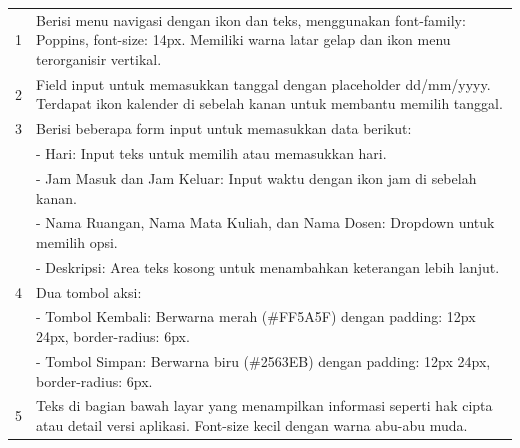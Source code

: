\begin{enumerate}
{\begin{longtable}{c p{}}
		      1                       & Berisi menu navigasi dengan ikon dan teks, menggunakan font-family: Poppins, font-size: 14px. Memiliki warna latar gelap dan ikon menu terorganisir vertikal. \\
		      2                       & Field input untuk memasukkan tanggal dengan placeholder dd/mm/yyyy. Terdapat ikon kalender di sebelah kanan untuk membantu memilih tanggal.                   \\
		      3                       & Berisi beberapa form input untuk memasukkan data berikut:                                                                                                     \\
		                              & - Hari: Input teks untuk memilih atau memasukkan hari.                                                                                                        \\
		                              & - Jam Masuk dan Jam Keluar: Input waktu dengan ikon jam di sebelah kanan.                                                                                     \\
		                              & - Nama Ruangan, Nama Mata Kuliah, dan Nama Dosen: Dropdown untuk memilih opsi.                                                                                \\
		                              & - Deskripsi: Area teks kosong untuk menambahkan keterangan lebih lanjut.                                                                                      \\
		      4                       & Dua tombol aksi:                                                                                                                                              \\
		                              & - Tombol Kembali: Berwarna merah (\#FF5A5F) dengan padding: 12px 24px, border-radius: 6px.                                                                    \\
		                              & - Tombol Simpan: Berwarna biru (\#2563EB) dengan padding: 12px 24px, border-radius: 6px.                                                                      \\
		      5                       & Teks di bagian bawah layar yang menampilkan informasi seperti hak cipta atau detail versi aplikasi. Font-size kecil dengan warna abu-abu muda.                \\
		      \hline
	      \end{longtable}
	      }


\end{enumerate}
